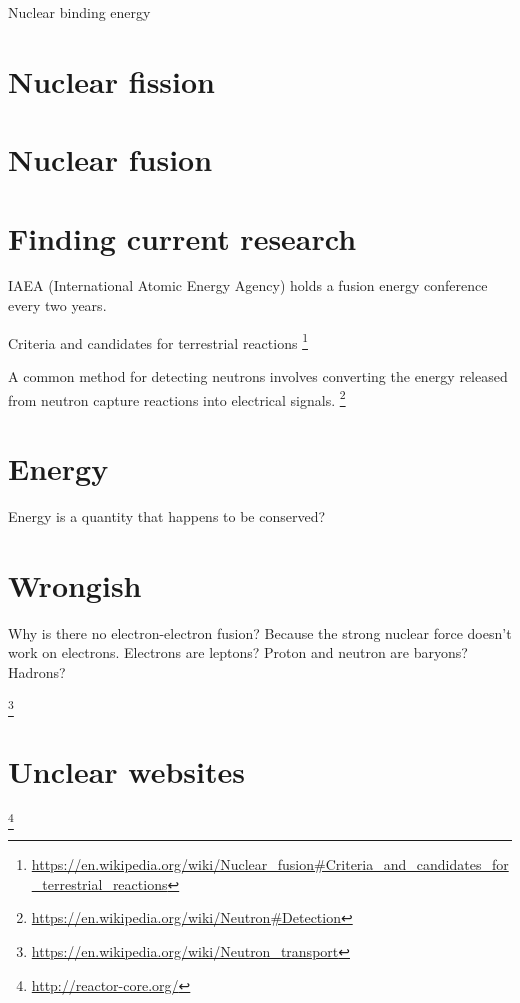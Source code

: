 Nuclear binding energy

\section{Nuclear fission}

\section{Nuclear fusion}

\section{Finding current research}

IAEA (International Atomic Energy Agency) holds a fusion energy conference every two years.





Criteria and candidates for terrestrial reactions
\footnote{\url{https://en.wikipedia.org/wiki/Nuclear_fusion\#Criteria_and_candidates_for_terrestrial_reactions}}

A common method for detecting neutrons involves converting the energy released from neutron capture reactions into electrical signals.%
\footnote{\url{https://en.wikipedia.org/wiki/Neutron\#Detection}}

\section{Energy}

Energy is a quantity that happens to be conserved?

\section{Wrongish}

Why is there no electron-electron fusion?
Because the strong nuclear force doesn't work on electrons.
Electrons are leptons?
Proton and neutron are baryons?
Hadrons?

\footnote{\url{https://en.wikipedia.org/wiki/Neutron_transport}}

\section{Unclear websites}

\footnote{\url{http://reactor-core.org/}}
